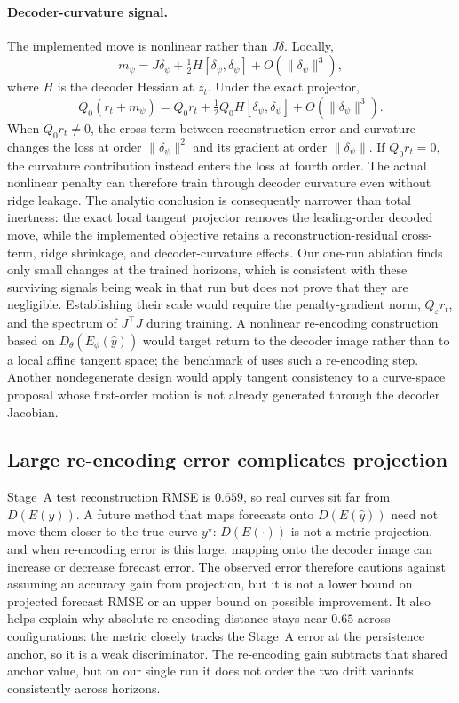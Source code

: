 \documentclass{article} %
\begin{document}
\paragraph{Decoder-curvature signal.} The implemented move is nonlinear rather than
$J\delta$. Locally,
\begin{equation}
  m_\psi=J\delta_\psi+\tfrac12 H[\delta_\psi,\delta_\psi]
  +O(\lVert\delta_\psi\rVert^3),
\end{equation}
where $H$ is the decoder Hessian at $z_t$. Under the exact projector,
\begin{equation}
  Q_0(r_t+m_\psi)
  =Q_0r_t+\tfrac12Q_0H[\delta_\psi,\delta_\psi]
  +O(\lVert\delta_\psi\rVert^3).
\end{equation}
When $Q_0r_t\ne0$, the cross-term between reconstruction error and curvature changes
the loss at order $\lVert\delta_\psi\rVert^2$ and its gradient at order
$\lVert\delta_\psi\rVert$. If $Q_0r_t=0$, the curvature contribution instead enters
the loss at fourth order. The actual nonlinear penalty can therefore train through
decoder curvature even without ridge leakage.
The analytic conclusion is consequently narrower than total inertness: the exact
local tangent projector removes the leading-order decoded move, while the
implemented objective retains a reconstruction-residual cross-term, ridge shrinkage,
and decoder-curvature effects. Our one-run ablation finds only small changes at the
trained horizons, which is consistent with these surviving signals being weak in
that run but does not prove that they are negligible. Establishing their scale would
require the penalty-gradient norm, $Q_\varepsilon r_t$, and the spectrum of
$J^{\top}J$ during training.
A nonlinear re-encoding construction based on $D_\theta(E_\phi(\hat y))$ would
target return to the decoder image rather than to a local affine tangent space; the
benchmark of \citet{NoArbVAEYieldCurves} uses such a re-encoding step. Another
nondegenerate design would apply tangent consistency to a curve-space proposal whose
first-order motion is not already generated through the decoder Jacobian.
\subsection{Large re-encoding error complicates projection}
\label{sec:analysis-reencoding}
Stage~A test reconstruction RMSE is $0.659$, so real curves sit far from
$D(E(y))$. A future method that maps forecasts onto $D(E(\hat y))$ need not move them
closer to the true curve $y^\star$: $D(E(\cdot))$ is not a metric projection, and
when re-encoding error is this large, mapping onto the decoder image can increase or
decrease forecast error. The observed error therefore cautions against assuming an
accuracy gain from projection, but it is not a lower bound on projected forecast
RMSE or an upper bound on possible improvement.
It also helps explain why absolute re-encoding distance stays near $0.65$ across
configurations: the metric closely tracks the Stage~A error at the persistence
anchor, so it is a weak discriminator. The re-encoding gain subtracts that shared
anchor value, but on our single run it does not order the two drift variants
consistently across horizons.
\end{document}

